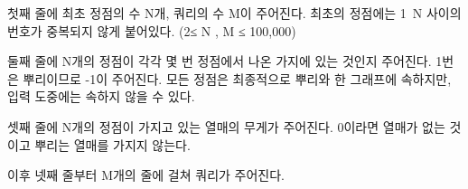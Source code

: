 첫째 줄에 최초 정점의 수 N개, 쿼리의 수 M이 주어진다. 
최초의 정점에는 1~N 사이의 번호가 중복되지 않게 붙어있다. (2≤ N , M ≤ 100,000)

둘째 줄에 N개의 정점이 각각 몇 번 정점에서 나온 가지에 있는 것인지 주어진다.
1번은 뿌리이므로 -1이 주어진다.
모든 정점은 최종적으로 뿌리와 한 그래프에 속하지만, 입력 도중에는 속하지 않을 수 있다.

셋째 줄에 N개의 정점이 가지고 있는 열매의 무게가 주어진다. 0이라면 열매가 없는 것이고 뿌리는 열매를 가지지 않는다.

이후 넷째 줄부터 M개의 줄에 걸쳐 쿼리가 주어진다.
